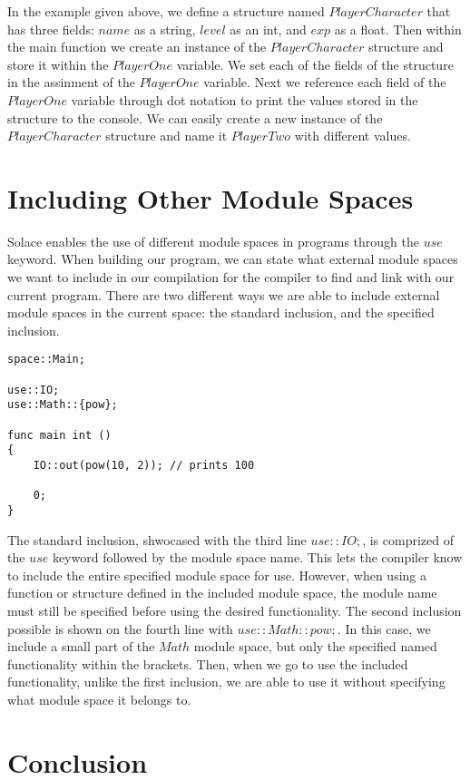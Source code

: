 \documentclass{article}
\begin{document}
In the example given above, we define a structure named $PlayerCharacter$ that has three fields: $name$ as a string, $level$ as an int, and $exp$
as a float. Then within the main function we create an instance of the $PlayerCharacter$ structure and store it within the $PlayerOne$ variable.
We set each of the fields of the structure in the assinment of the $PlayerOne$ variable. Next we reference each field of the $PlayerOne$ variable
through dot notation to print the values stored in the structure to the console. We can easily create a new instance of the $PlayerCharacter$ structure
and name it $PlayerTwo$ with different values.


\section{Including Other Module Spaces}

Solace enables the use of different module spaces in programs through the $use$ keyword. When building our program, we can state what external module spaces we want to include in
our compilation for the compiler to find and link with our current program. There are two different ways we are able to include external module spaces in the current space: the
standard inclusion, and the specified inclusion.

\begin{lstlisting}
space::Main;

use::IO;
use::Math::{pow};

func main int ()
{
	IO::out(pow(10, 2)); // prints 100

 	0;
}
\end{lstlisting}

The standard inclusion, shwocased with the third line $use::IO;$, is comprized of the $use$ keyword followed by the module space name. This lets the compiler know to include the
entire specified module space for use. However, when using a function or structure defined in the included module space, the module name must still be specified before using the desired
functionality. The second inclusion possible is shown on the fourth line with $use::Math::{pow};$. In this case, we include a small part of the $Math$ module space, but only the specified
named functionality within the brackets. Then, when we go to use the included functionality, unlike the first inclusion, we are able to use it without specifying what module space it belongs
to.


\section{Conclusion}
\end{document}
